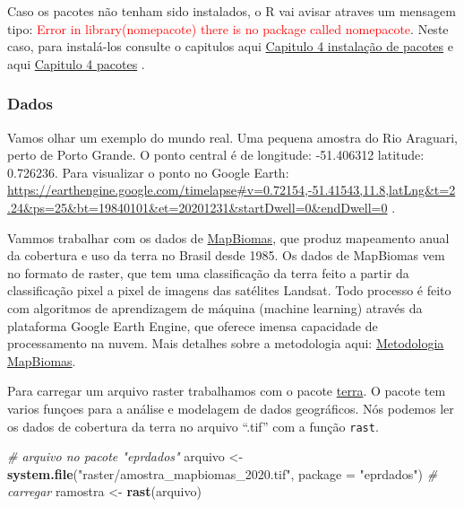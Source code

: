 \documentclass[
]{article}
\newenvironment{Shaded}{\begin{snugshade}}{\end{snugshade}}
\newcommand{\AttributeTok}[1]{\textcolor[rgb]{0.13,0.29,0.53}{#1}}
\newcommand{\CommentTok}[1]{\textcolor[rgb]{0.56,0.35,0.01}{\textit{#1}}}
\newcommand{\FunctionTok}[1]{\textcolor[rgb]{0.13,0.29,0.53}{\textbf{#1}}}
\newcommand{\NormalTok}[1]{#1}
\newcommand{\OtherTok}[1]{\textcolor[rgb]{0.56,0.35,0.01}{#1}}
\newcommand{\StringTok}[1]{\textcolor[rgb]{0.31,0.60,0.02}{#1}}
\begin{document}
Caso os pacotes não tenham sido instalados, o R vai avisar atraves um mensagem tipo: \textcolor{red}{Error in library(nomepacote)  there is no package called nomepacote}. Neste caso, para instalá-los consulte o capitulos aqui \href{https://livro.curso-r.com/4-1-instala\%C3\%A7\%C3\%A3o-de-pacotes.html}{Capitulo 4 instalação de pacotes} e aqui \href{https://analises-ecologicas.com/cap4\#pacotes-1}{Capitulo 4 pacotes} .

\newpage

\hypertarget{dados}{%
\subsubsection{Dados}\label{dados}}

Vamos olhar um exemplo do mundo real. Uma pequena amostra do Rio Araguari, perto de Porto Grande. O ponto central é de longitude: -51.406312 latitude: 0.726236. Para visualizar o ponto no Google Earth: \url{https://earthengine.google.com/timelapse\#v=0.72154,-51.41543,11.8,latLng\&t=2.24\&ps=25\&bt=19840101\&et=20201231\&startDwell=0\&endDwell=0} .

Vammos trabalhar com os dados de \href{https://mapbiomas.org/}{MapBiomas}, que produz mapeamento anual da cobertura e uso da terra no Brasil desde 1985. Os dados de MapBiomas vem no formato de raster, que tem uma classificação da terra feito a partir da classificação pixel a pixel de imagens das satélites Landsat. Todo processo é feito com algoritmos de aprendizagem de máquina (machine learning) através da plataforma Google Earth Engine, que oferece imensa capacidade de processamento na nuvem. Mais detalhes sobre a metodologia aqui: \href{https://brasil.mapbiomas.org/visao-geral-da-metodologia/}{Metodologia MapBiomas}.

Para carregar um arquivo raster trabalhamos com o pacote \href{https://CRAN.R-project.org/package=terra}{terra}. O pacote tem varios funçoes para a análise e modelagem de dados geográficos. Nós podemos ler os dados de cobertura da terra no arquivo ``.tif'' com a função \texttt{rast}.

\begin{Shaded}
\begin{Highlighting}[]
\CommentTok{\# arquivo no pacote "eprdados"}
\NormalTok{arquivo }\OtherTok{\textless{}{-}} \FunctionTok{system.file}\NormalTok{(}\StringTok{"raster/amostra\_mapbiomas\_2020.tif"}\NormalTok{, }
                       \AttributeTok{package =} \StringTok{"eprdados"}\NormalTok{)}
\CommentTok{\# carregar}
\NormalTok{ramostra }\OtherTok{\textless{}{-}} \FunctionTok{rast}\NormalTok{(arquivo)}
\end{Highlighting}
\end{Shaded}
\end{document}

